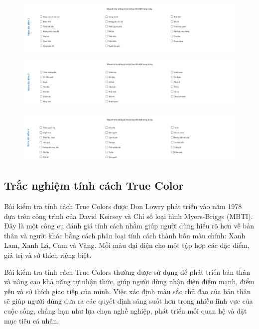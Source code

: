 \begin{figure}[H]
    \centering
    \includegraphics[width=1.2\linewidth]{images/ws2.png}
\end{figure}

\begin{figure}[H]
    \centering
    \includegraphics[width=1.2\linewidth]{images/ws3.png}
\end{figure}

\begin{figure}[H]
    \centering
    \includegraphics[width=1.2\linewidth]{images/ws4.png}
\end{figure}

\subsection{Trắc nghiệm tính cách True Color}

Bài kiểm tra tính cách True Colors được Don Lowry phát triển vào năm 1978 dựa trên công trình của David Keirsey và Chỉ số loại hình Myers-Briggs (MBTI). Đây là một công cụ đánh giá tính cách nhằm giúp người dùng hiểu rõ hơn về bản thân và người khác bằng cách phân loại tính cách thành bốn màu chính: Xanh Lam, Xanh Lá, Cam và Vàng. Mỗi màu đại diện cho một tập hợp các đặc điểm, giá trị và sở thích riêng biệt.

Bài kiểm tra tính cách True Colors thường được sử dụng để phát triển bản thân và nâng cao khả năng tự nhận thức, giúp người dùng nhận diện điểm mạnh, điểm yếu và sở thích giao tiếp của mình. Việc xác định màu sắc chủ đạo của bản thân sẽ giúp người dùng đưa ra các quyết định sáng suốt hơn trong nhiều lĩnh vực của cuộc sống, chẳng hạn như lựa chọn nghề nghiệp, phát triển mối quan hệ và đặt mục tiêu cá nhân.

